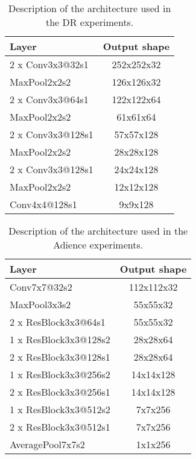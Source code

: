 \documentclass[journal]{IEEEtran}
\begin{document}
	\begin{table}[!t]
		\caption{Description of the architecture used in the DR experiments.}
		\label{table:CNNArchitecture}
		\centering
		\begin{tabular}{|l|c|}
			\hline
			\textbf{Layer} & \textbf{Output shape}\\
			\hline
			2 x Conv3x3@32s1 & 252x252x32\\\hline
			MaxPool2x2s2 & 126x126x32\\\hline
			
			2 x Conv3x3@64s1 & 122x122x64\\\hline
			MaxPool2x2s2 & 61x61x64\\\hline
			
			2 x Conv3x3@128s1 & 57x57x128\\\hline
			MaxPool2x2s2 & 28x28x128\\\hline
			
			2 x Conv3x3@128s1 & 24x24x128\\\hline
			MaxPool2x2s2 & 12x12x128\\\hline
			
			Conv4x4@128s1 & 9x9x128\\
			\hline
		\end{tabular}	
	\end{table}
	
	\begin{table}[!t]
		\caption{Description of the architecture used in the Adience experiments.}
		\label{table:ResNetArchitecture}
		\centering
		\begin{tabular}{|l|c|}
			\hline
			\textbf{Layer} & \textbf{Output shape}\\
			\hline
			Conv7x7@32s2 & 112x112x32\\\hline
			MaxPool3x3s2 & 55x55x32\\\hline
			2 x ResBlock3x3@64s1 & 55x55x32\\\hline
			1 x ResBlock3x3@128s2 & 28x28x64\\\hline
			2 x ResBlock3x3@128s1 & 28x28x64\\\hline
			1 x ResBlock3x3@256s2 & 14x14x128\\\hline
			2 x ResBlock3x3@256s1 & 14x14x128\\\hline
			1 x ResBlock3x3@512s2 & 7x7x256\\\hline
			2 x ResBlock3x3@512s1 & 7x7x256\\\hline
			AveragePool7x7s2 & 1x1x256\\
			\hline
		\end{tabular}	
	\end{table}
	
\end{document}
